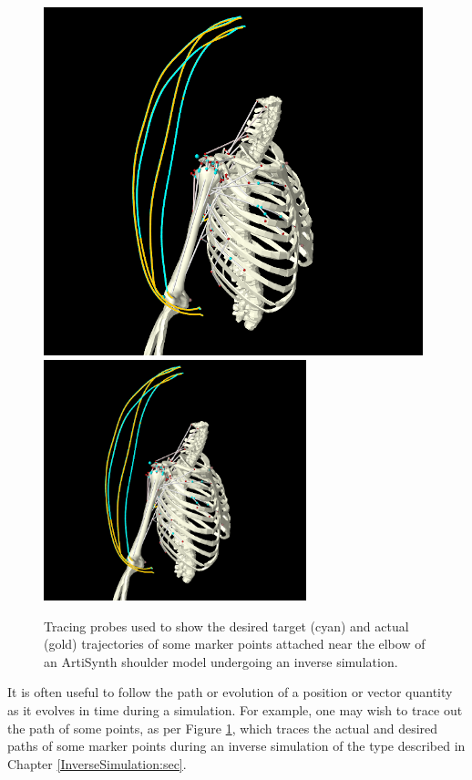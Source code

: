 \begin{figure}[ht]
\begin{center}
\iflatexml
 \includegraphics[]{images/shoulderTracing}
\else
 \includegraphics[width=3in]{images/shoulderTracing}
\fi
\end{center}
\caption{Tracing probes used to show the desired target (cyan)
and actual (gold) trajectories of some marker points attached near the elbow of
an ArtiSynth shoulder model undergoing an inverse simulation.}
\label{shoulderTracing:fig}
\end{figure}

It is often useful to follow the path or evolution of a position or vector
quantity as it evolves in time during a simulation. For example, one may wish
to trace out the path of some points, as per Figure \ref{shoulderTracing:fig},
which traces the actual and desired paths of some marker points during an
inverse simulation of the type described in
Chapter \ref{InverseSimulation:sec}.


